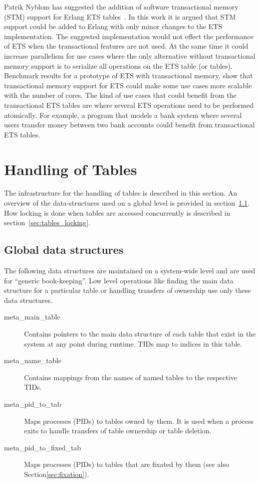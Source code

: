 \documentclass[aps,pre,preprint,nofootinbib]{revtex4}
\begin{document}
  Patrik Nyblom has suggested the addition of software transactional memory (STM) support for Erlang ETS tables~\cite{PatrikErlangTrans}.
  In this work it is argued that STM support could be added to Erlang with only minor changes to the ETS implementation.
  The suggested implementation would not effect the performance of ETS when the transactional features are not used.
  At the same time it could increase parallelism for use cases where the only alternative without transactional memory support is to serialize all operations on the ETS table (or tables).
  Benchmark results for a prototype of ETS with transactional memory, show that transactional memory support for ETS could make some use cases more scalable with the number of cores.
  The kind of use cases that could benefit from the transactional ETS tables are where several ETS operations need to be performed atomically.
  For example, a program that models a bank system where several users transfer money between two bank accounts could benefit from transactional ETS tables.

\section{Handling of Tables}

The infrastructure for the handling of tables is described in this section.
An overview of the data-structures used on a global level is provided in section~\ref{sec:tables_overview}.
How locking is done when tables are accessed concurrently is described in section~\ref{sec:tables_locking}.

\subsection{Global data structures}
\label{sec:tables_overview}

The following data structures are maintained on a system-wide level and are used for ``generic book-keeping''.
Low level operations like finding the main data structure for a particular table or handling transfers of ownership use only these data structures.

\begin{description}
\item[meta\_main\_table]
  Contains pointers to the main data structure of each table that exist in the system at any point during runtime.
  TIDs map to indices in this table.
\item[meta\_name\_table]
  Contains mappings from the names of named tables to the respective TIDs.
\item[meta\_pid\_to\_tab]
  Maps processes (PIDs) to tables owned by them.
  It is used when a process exits to handle transfers of table ownership or table deletion.
\item[meta\_pid\_to\_fixed\_tab]
  Maps processes (PIDs) to tables that are fixated by them (see also Section\ref{sec:fixation}).
\end{description}
\end{document}
